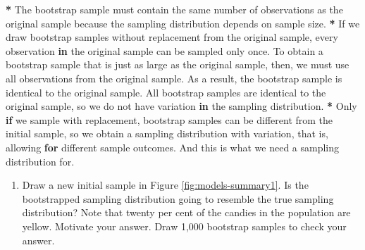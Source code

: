 \documentclass[a4paper]{book}
\newenvironment{Shaded}{\begin{snugshade}}{\end{snugshade}}
\newcommand{\StringTok}[1]{\textcolor[rgb]{0.00,0.00,0.00}{#1}}
\newcommand{\ControlFlowTok}[1]{\textcolor[rgb]{0.00,0.00,0.00}{\textbf{#1}}}
\newcommand{\OperatorTok}[1]{\textcolor[rgb]{0.00,0.00,0.00}{\textbf{#1}}}
\newcommand{\NormalTok}[1]{#1}
\providecommand{\tightlist}{%
  \setlength{\itemsep}{0pt}\setlength{\parskip}{0pt}}
\theoremstyle{definition}
\theoremstyle{definition}
\theoremstyle{definition}
\theoremstyle{remark}
\begin{document}
\begin{Shaded}
\begin{Highlighting}[]
\OperatorTok{*}\StringTok{ }\NormalTok{The bootstrap sample must contain the same number of observations as the}
\NormalTok{original sample because the sampling distribution depends on sample size. }
\OperatorTok{*}\StringTok{ }\NormalTok{If we draw bootstrap samples without replacement from the original sample,}
\NormalTok{every observation }\ControlFlowTok{in}\NormalTok{ the original sample can be sampled only once. To obtain a}
\NormalTok{bootstrap sample that is just as large as the original sample, then, we must}
\NormalTok{use all observations from the original sample. As a result, the bootstrap}
\NormalTok{sample is identical to the original sample. All bootstrap samples are identical}
\NormalTok{to the original sample, so we do not have variation }\ControlFlowTok{in}\NormalTok{ the sampling}
\NormalTok{distribution.}
\OperatorTok{*}\StringTok{ }\NormalTok{Only }\ControlFlowTok{if}\NormalTok{ we sample with replacement, bootstrap samples can be different from}
\NormalTok{the initial sample, so we obtain a sampling distribution with variation, that}
\NormalTok{is, allowing }\ControlFlowTok{for}\NormalTok{ different sample outcomes. And this is what we need a}
\NormalTok{sampling distribution for.}
\end{Highlighting}
\end{Shaded}

\begin{enumerate}
\def\labelenumi{\arabic{enumi}.}
\setcounter{enumi}{2}
\tightlist
\item
  Draw a new initial sample in Figure \ref{fig:models-summary1}. Is the
  bootstrapped sampling distribution going to resemble the true sampling
  distribution? Note that twenty per cent of the candies in the
  population are yellow. Motivate your answer. Draw 1,000 bootstrap
  samples to check your answer.
\end{enumerate}
\end{document}
